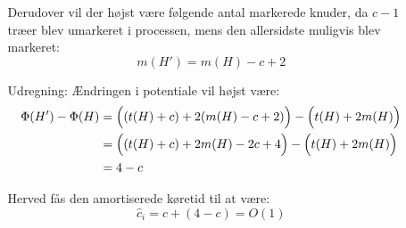 \begin{itemize}
\begin{itemize}
	Derudover vil der højst være følgende antal markerede knuder, da $c-1$ træer blev umarkeret i processen, mens den allersidste muligvis blev markeret:
	$$
	m(H') = m(H) - c + 2
	$$
	
	\item[Udregning:] Ændringen i potentiale vil højst være:
	\begin{align*}
	\Phi(H') - \Phi(H)
	&= \Big(  (t(H) + c) + 2(m(H) - c + 2)  \Big) - \Big(  t(H) + 2m(H)  \Big)\\
	&= \Big(  (t(H) + c) + 2m(H) - 2c + 4  \Big) - \Big(  t(H) + 2m(H)  \Big)\\
	&= 4 - c
	\end{align*}
	
	Herved fås den amortiserede køretid til at være:
	$$
	\hat c_i = c + (4 - c) = O(1)
	$$
	
\end{itemize}
\end{itemize}

